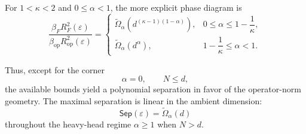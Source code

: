 \documentclass[11pt]{article}
\newcommand{\op}{\mathrm{op}}
\newcommand{\Sep}{\mathsf{Sep}}
\newcommand{\eps}{\varepsilon}
\begin{document}
For $1<\kappa<2$ and $0\le\alpha<1$, the more explicit phase diagram is
\[
\boxed{
\frac{\beta_FR_F^2(\eps)} {\beta_{\op}R_{\op}^2(\eps)} =
\begin{cases}
\widetilde\Omega_\alpha\left( d^{(\kappa-1)(1-\alpha)} \right), & 0\le\alpha\le1-\dfrac1\kappa, \\[3mm]
\widetilde\Omega_\alpha(d^\alpha), & 1-\dfrac1\kappa\le\alpha<1.
\end{cases}
}
\]

Thus, except for the corner
\[
\alpha=0,\qquad N\le d,
\]
the available bounds yield a polynomial separation in favor of the
operator-norm geometry. The maximal separation is linear in the
ambient dimension:
\[
\Sep(\eps)=\widetilde\Omega_\alpha(d)
\]
throughout the heavy-head regime $\alpha\ge1$ when $N>d$.
\end{document}
